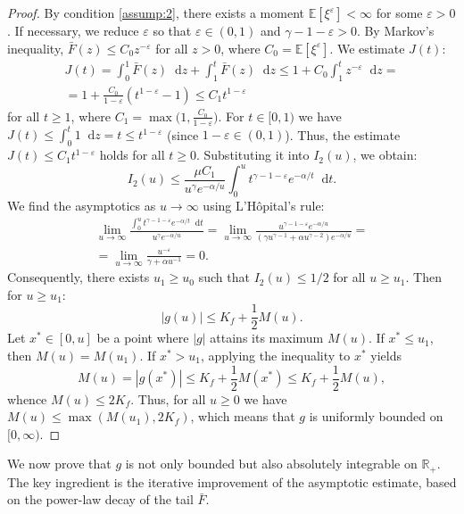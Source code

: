 \documentclass[smallextended]{svjour3}
\providecommand{\diff}{\mathop{}\!\mathrm{d}}
\begin{document}
\begin{proof}
By condition \ref{assump:2}, there exists a moment $\mathbb{E}[\xi^\varepsilon]<\infty$ for some $\varepsilon>0$. If necessary, we reduce $\varepsilon$ so that $\varepsilon\in(0,1)$ and $\gamma-1-\varepsilon>0$. By Markov's inequality, $\bar F(z) \le C_0 z^{-\varepsilon}$ for all $z>0$, where $C_0 = \mathbb{E}[\xi^\varepsilon]$. We estimate $J(t)$:
\begin{multline*}
J(t) = \int_0^1 \bar F(z) \diff z + \int_1^t \bar F(z) \diff z \le 1 + C_0 \int_1^t z^{-\varepsilon} \diff z =
\\
= 1 + \frac{C_0}{1-\varepsilon}(t^{1-\varepsilon}-1) \le C_1 t^{1-\varepsilon}
\end{multline*}
for all $t \ge 1$, where $C_1 = \max\bigl(1, \frac{C_0}{1-\varepsilon}\bigr)$. For $t \in[0,1)$ we have $J(t) \le \int_0^t 1 \diff z = t \le t^{1-\varepsilon}$ (since $1-\varepsilon \in (0,1)$). Thus, the estimate $J(t) \le C_1 t^{1-\varepsilon}$ holds for all $t \ge 0$. Substituting it into $I_2(u)$, we obtain:
\[
I_2(u) \le \frac{\mu C_1}{u^\gamma e^{-\alpha/u}} \int_0^u t^{\gamma-1-\varepsilon} e^{-\alpha/t} \diff t.
\]
We find the asymptotics as $u\to\infty$ using L'Hôpital's rule:
\begin{multline*}
\lim_{u\to\infty} \frac{\int_0^u t^{\gamma-1-\varepsilon} e^{-\alpha/t} \diff t}{u^\gamma e^{-\alpha/u}}
= \lim_{u\to\infty} \frac{u^{\gamma-1-\varepsilon} e^{-\alpha/u}}{(\gamma u^{\gamma-1} + \alpha u^{\gamma-2}) e^{-\alpha/u}}
=
\\
= \lim_{u\to\infty} \frac{u^{-\varepsilon}}{\gamma + \alpha u^{-1}} = 0.
\end{multline*}
Consequently, there exists $u_1 \ge u_0$ such that $I_2(u) \le 1/2$ for all $u \ge u_1$. Then for $u \ge u_1$:
\[
|g(u)| \le K_f + \frac{1}{2} M(u).
\]
Let $x^* \in [0,u]$ be a point where $|g|$ attains its maximum $M(u)$. If $x^* \le u_1$, then $M(u) = M(u_1)$. If $x^* > u_1$, applying the inequality to $x^*$ yields
\[
M(u) = |g(x^*)| \le K_f + \frac{1}{2} M(x^*) \le K_f + \frac{1}{2} M(u),
\]
whence $M(u) \le 2K_f$. Thus, for all $u \ge 0$ we have $M(u) \le \max(M(u_1), 2K_f)$, which means that $g$ is uniformly bounded on $[0,\infty)$.
\end{proof}

We now prove that $g$ is not only bounded but also absolutely integrable on $\mathbb{R}_+$. The key ingredient is the iterative improvement of the asymptotic estimate, based on the power-law decay of the tail $\bar F$.
\end{document}
